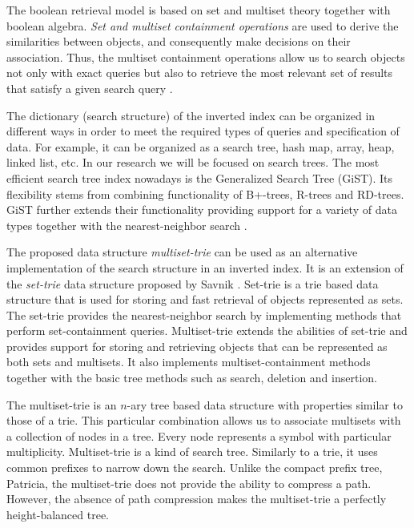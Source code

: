 The boolean retrieval model is based on set and multiset theory together with 
boolean algebra. \emph{Set and multiset containment operations} are used to 
derive the similarities between objects, and consequently make decisions on their 
association. Thus, the multiset containment operations allow us to 
search objects not only with exact queries but also to retrieve the most relevant 
set of results that satisfy a given search query \cite{baeza1999modern,manning2008introduction,zobel2006inverted}.

%

The dictionary (search structure) of the inverted index can be organized in different ways in 
order to meet the required types of queries and specification of data. For example, 
it can be organized as a search tree, hash map, array, heap, linked list, etc. In our 
research we will be focused on search trees. The most efficient search tree index 
nowadays is the Generalized Search Tree (GiST). Its flexibility stems from combining 
functionality of B+-trees, R-trees and RD-trees. GiST further extends their functionality 
providing support for a variety of data types together with the nearest-neighbor 
search \cite{broder2006indexing,hellerstein1995generalized,kornacker1999high}.

%
The proposed data structure \emph{multiset-trie} can be used as an alternative 
implementation of the search structure in an inverted index. It is an extension of 
the \emph{set-trie} data structure proposed by Savnik \cite{savnik2013index}. 
Set-trie is a trie based data structure that is used for storing and fast retrieval of 
objects represented as sets. The set-trie provides the nearest-neighbor search by 
implementing methods that perform set-containment queries. Multiset-trie extends 
the abilities of set-trie and provides support for storing and retrieving objects 
that can be represented as both sets and multisets. It also implements 
multiset-containment methods together with the basic tree methods such as search, 
deletion and insertion.

The multiset-trie is an $n$-ary tree based data structure with properties similar to 
those of a trie. 
This particular combination allows us to associate multisets with a collection 
of nodes in a tree. Every node represents a symbol with particular multiplicity. 
%
Multiset-trie is a kind of search tree. Similarly to a trie, it uses common prefixes 
to narrow down the search. Unlike the compact prefix tree, Patricia, the multiset-trie 
does not provide the ability to compress a path. However, the absence of path 
compression makes the multiset-trie a perfectly height-balanced tree.

